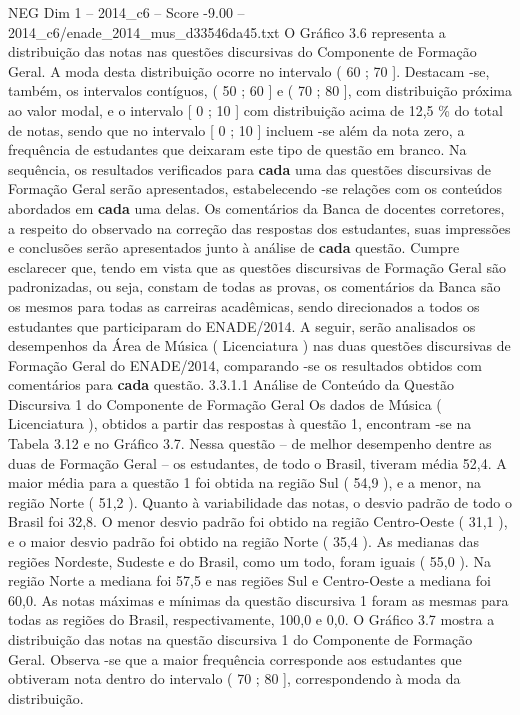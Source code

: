 \begin{textsample}{NEG Dim 1 – 2014\_c6 – Score -9.00 – 2014\_c6/enade\_2014\_mus\_d33546da45.txt}
O Gráfico 3.6 representa a distribuição das notas nas questões discursivas do Componente de Formação Geral.
A moda desta distribuição ocorre no intervalo ( 60 ; 70 ].
Destacam -se, também, os intervalos contíguos, ( 50 ; 60 ] e ( 70 ; 80 ], com distribuição próxima ao valor modal, e o intervalo [ 0 ; 10 ] com distribuição acima de 12,5 \% do total de notas, sendo que no intervalo [ 0 ; 10 ] incluem -se além da nota zero, a frequência de estudantes que deixaram este tipo de questão em branco.
Na sequência, os resultados verificados para \textbf{cada} uma das questões discursivas de Formação Geral serão apresentados, estabelecendo -se relações com os conteúdos abordados em \textbf{cada} uma delas.
Os comentários da Banca de docentes corretores, a respeito do observado na correção das respostas dos estudantes, suas impressões e conclusões serão apresentados junto à análise de \textbf{cada} questão.
Cumpre esclarecer que, tendo em vista que as questões discursivas de Formação Geral são padronizadas, ou seja, constam de todas as provas, os comentários da Banca são os mesmos para todas as carreiras acadêmicas, sendo direcionados a todos os estudantes que participaram do ENADE/2014.
A seguir, serão analisados os desempenhos da Área de Música ( Licenciatura ) nas duas questões discursivas de Formação Geral do ENADE/2014, comparando -se os resultados obtidos com comentários para \textbf{cada} questão. 3.3.1.1 Análise de Conteúdo da Questão Discursiva 1 do Componente de Formação Geral Os dados de Música ( Licenciatura ), obtidos a partir das respostas à questão 1, encontram -se na Tabela 3.12 e no Gráfico 3.7.
Nessa questão – de melhor desempenho dentre as duas de Formação Geral – os estudantes, de todo o Brasil, tiveram média 52,4.
A maior média para a questão 1 foi obtida na região Sul ( 54,9 ), e a menor, na região Norte ( 51,2 ).
Quanto à variabilidade das notas, o desvio padrão de todo o Brasil foi 32,8.
O menor desvio padrão foi obtido na região Centro-Oeste ( 31,1 ), e o maior desvio padrão foi obtido na região Norte ( 35,4 ).
As medianas das regiões Nordeste, Sudeste e do Brasil, como um todo, foram iguais ( 55,0 ).
Na região Norte a mediana foi 57,5 e nas regiões Sul e Centro-Oeste a mediana foi 60,0.
As notas máximas e mínimas da questão discursiva 1 foram as mesmas para todas as regiões do Brasil, respectivamente, 100,0 e 0,0.
O Gráfico 3.7 mostra a distribuição das notas na questão discursiva 1 do Componente de Formação Geral.
Observa -se que a maior frequência corresponde aos estudantes que obtiveram nota dentro do intervalo ( 70 ; 80 ], correspondendo à moda da distribuição.

\end{textsample}
